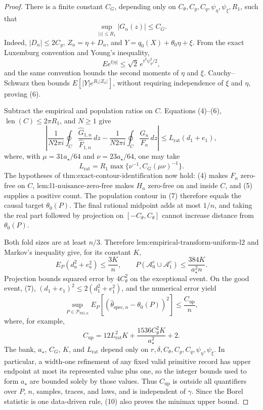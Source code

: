 \documentclass{article}
\begin{document}
\begin{proof}
There is a finite constant \(C_G\), depending only on
\(C_{\theta},C_g,C_q,\psi_{\eta},\psi_{\xi},R_1\), such that
\[
 \sup_{|z|\le R_1}|G_n(z)|\le C_G.                               \tag{6}
\]
Indeed, \(|D_n|\le2C_g\), \(Z_n=\eta+D_n\), and
\(Y=q_0(X)+\theta_0\eta+\xi\).  From the exact Luxemburg convention and
Young's inequality,
\[
 E e^{t|\eta|}\le\sqrt2\,e^{t^2\psi_{\eta}^2/2},
\]
and the same convention bounds the second moments of \(\eta\) and \(\xi\).
Cauchy--Schwarz then bounds
\(E[|Y|e^{R_1|Z_n|}]\), without requiring independence of \(\xi\) and
\(\eta\), proving (6).

Subtract the empirical and population ratios on \(C\).  Equations
(4)--(6), \(\operatorname{len}(C)\le2\pi R_1\), and \(N\ge1\) give
\[
 \left|
 \frac1{N2\pi i}\oint_C\frac{\widehat G_{1,n}}{\widehat F_{1,n}}\,dz
 -\frac1{N2\pi i}\oint_C\frac{G_n}{F_n}\,dz
 \right|
 \le L_{\mathrm{rat}}(d_1+e_1),                                  \tag{7}
\]
where, with \(\mu=31a_{\star}/64\) and
\(\nu=23a_{\star}/64\), one may take
\[
 L_{\mathrm{rat}}
 =R_1\max\{\nu^{-1},C_G(\mu\nu)^{-1}\}.                         \tag{8}
\]
The hypotheses of \(\text{thm:exact-contour-identification}\) now hold:
(4) makes \(F_n\) zero-free on \(C\),
\(\text{lem:l1-nuisance-zero-free}\) makes \(H_n\) zero-free on and inside
\(C\), and (5) supplies a positive count.  The population contour in (7)
therefore equals the causal target \(\theta_0(P)\).  The final rational
midpoint adds at most \(1/n\), and taking the real part followed by
projection on \([-C_{\theta},C_{\theta}]\) cannot increase distance from
\(\theta_0(P)\).

Both fold sizes are at least \(n/3\).  Therefore
\(\text{lem:empirical-transform-uniform-l2}\) and Markov's inequality give,
for its constant \(K\),
\[
 E_P(d_a^2+e_a^2)\le\frac{3K}{n},
 \qquad
 P(\mathcal A_0^c\cup\mathcal A_1^c)
 \le\frac{384K}{a_{\star}^2n}.                                  \tag{9}
\]
Projection bounds squared error by \(4C_{\theta}^2\) on the exceptional
event.  On the good event, (7),
\((d_1+e_1)^2\le2(d_1^2+e_1^2)\), and the numerical error yield
\[
 \sup_{P\in\mathcal P_{\mathrm{NG},n}}
 E_P[(\widehat\theta_{\mathrm{spec},n}-\theta_0(P))^2]
 \le\frac{C_{\mathrm{up}}}{n},                                  \tag{10}
\]
where, for example,
\[
 C_{\mathrm{up}}
 =12L_{\mathrm{rat}}^2K
 +\frac{1536C_{\theta}^2K}{a_{\star}^2}+2.                      \tag{11}
\]
The bank, \(a_{\star}\), \(C_G\), \(K\), and
\(L_{\mathrm{rat}}\) depend only on
\(r,\delta,C_{\theta},C_g,C_q,\psi_{\eta},\psi_{\xi}\).  In particular,
a width-one refinement of any fixed valid primitive record has upper endpoint
at most its represented value plus one, so the integer bounds used to form
\(a_{\star}\) are bounded solely by those values.  Thus
\(C_{\mathrm{up}}\) is outside all quantifiers over \(P\), \(n\), samples,
traces, and laws, and is independent of \(\gamma\).  Since the Borel
statistic is one data-driven rule, (10) also proves the minimax upper bound.


\end{proof}
\end{document}
